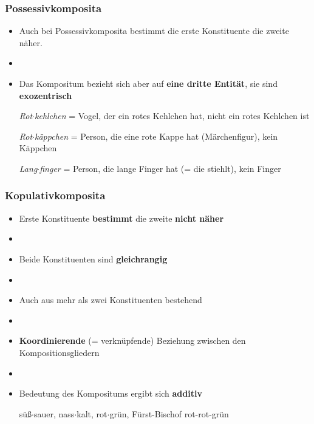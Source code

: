 \begin{frame}
\frametitle{Possessivkomposita}

\begin{itemize}
	\item Auch bei Possessivkomposita bestimmt die erste Konstituente die zweite näher.
	\item[]
	\item Das Kompositum bezieht sich aber auf \textbf{eine dritte Entität}, sie sind \textbf{exozentrisch}
	
	\ea \emph{Rot$\cdot$kehlchen} = Vogel, der ein rotes Kehlchen hat, nicht ein rotes Kehlchen ist
	\z
	
	\ea \emph{Rot$\cdot$käppchen} = Person, die eine rote Kappe hat (Märchenfigur), kein Käppchen
	\z
	
	\ea \emph{Lang$\cdot$finger} = Person, die lange Finger hat (= die stiehlt), kein Finger
	\z
	
\end{itemize}


\end{frame}




\begin{frame}
\frametitle{Kopulativkomposita}

\begin{itemize}
	\item Erste Konstituente \textbf{bestimmt} die zweite \textbf{nicht näher}
	\item[]
	\item Beide Konstituenten sind \textbf{gleichrangig}
	\item[]
	\item Auch aus mehr als zwei Konstituenten bestehend
	\item[]
	\item \textbf{Koordinierende} (= verknüpfende) Beziehung zwischen den Kompositionsgliedern
	\item[]
	\item Bedeutung des Kompositums ergibt sich \textbf{additiv}
	
	\eal 
	\ex süß$\cdot$sauer, nass$\cdot$kalt, rot$\cdot$grün, Fürst-Bischof
	\ex rot-rot-grün
	\zl
	
\end{itemize}


\end{frame}


